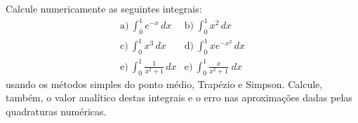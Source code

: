 \begin{exer}Calcule numericamente as seguintes integrais:
  \begin{eqnarray}
    \text{a)}~\int_0^1e^{-x}\,dx & \text{b)}~\int_0^1x^2\,dx\\
    \text{c)}~\int_0^1x^3\,dx & \text{d)}~\int_0^1xe^{-x^2}\,dx\\
    \text{e)}~\int_0^1\frac{1}{x^2+1}\,dx &\text{e)}~\int_0^1\frac{x}{x^2+1}\;dx
  \end{eqnarray}
usando os métodos simples do ponto médio, Trapézio e Simpson. Calcule, também, o valor analítico destas integrais e o erro nas aproximações dadas pelas quadraturas numéricas.
\end{exer}
%

%

